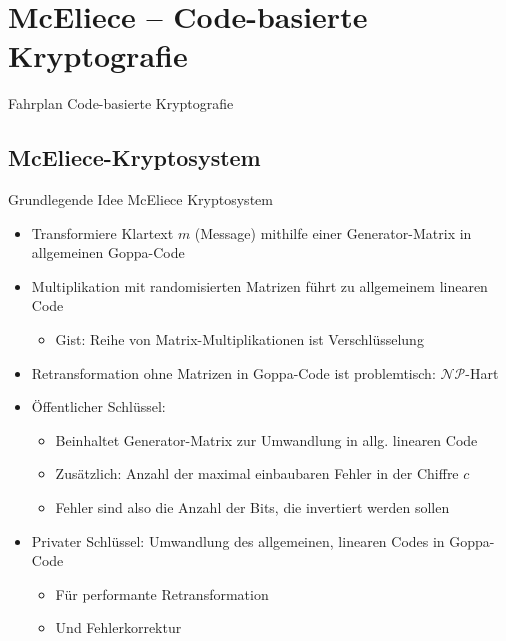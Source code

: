 \documentclass[11pt%
,aspectratio=169%
]{beamer}
\begin{document}
\section{McEliece -- Code-basierte Kryptografie}

\begin{frame}{Fahrplan Code-basierte Kryptografie}
\end{frame}


\subsection{McEliece-Kryptosystem}

\begin{frame}{Grundlegende Idee McEliece Kryptosystem}
	\begin{itemize}
		\item Transformiere Klartext $m$ (Message) mithilfe einer Generator-Matrix in allgemeinen Goppa-Code
		\item Multiplikation mit randomisierten Matrizen führt zu allgemeinem linearen Code
		\begin{itemize}
		    \item Gist: Reihe von Matrix-Multiplikationen ist Verschlüsselung
		\end{itemize}
		\item Retransformation ohne Matrizen in Goppa-Code ist problemtisch: $\mathcal{NP}$-Hart \cite{Stinson2018Cryptography}
        \item Öffentlicher Schlüssel:
        \begin{itemize}
            \item Beinhaltet Generator-Matrix zur Umwandlung in allg. linearen Code
            \item Zusätzlich: Anzahl der maximal einbaubaren Fehler in der Chiffre $c$
            \item Fehler sind also die Anzahl der Bits, die invertiert werden sollen
        \end{itemize}
	    \item Privater Schlüssel: Umwandlung des allgemeinen, linearen Codes in Goppa-Code
	    \begin{itemize}
	        \item Für performante Retransformation
	        \item Und Fehlerkorrektur
	    \end{itemize}
	\end{itemize}
\end{frame}
 
\end{document}
